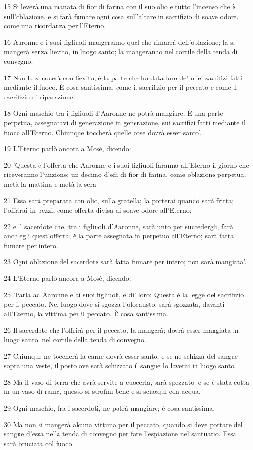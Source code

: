 \par 15 Si leverà una manata di fior di farina con il suo olio e tutto l'incenso che è sull'oblazione, e si farà fumare ogni cosa sull'altare in sacrifizio di soave odore, come una ricordanza per l'Eterno.
\par 16 Aaronne e i suoi figliuoli mangeranno quel che rimarrà dell'oblazione; la si mangerà senza lievito, in luogo santo; la mangeranno nel cortile della tenda di convegno.
\par 17 Non la si cocerà con lievito; è la parte che ho data loro de' miei sacrifizi fatti mediante il fuoco. È cosa santissima, come il sacrifizio per il peccato e come il sacrifizio di riparazione.
\par 18 Ogni maschio tra i figliuoli d'Aaronne ne potrà mangiare. È una parte perpetua, assegnatavi di generazione in generazione, sui sacrifizi fatti mediante il fuoco all'Eterno. Chiunque toccherà quelle cose dovrà esser santo'.
\par 19 L'Eterno parlò ancora a Mosè, dicendo:
\par 20 'Questa è l'offerta che Aaronne e i suoi figliuoli faranno all'Eterno il giorno che riceveranno l'unzione: un decimo d'efa di fior di farina, come oblazione perpetua, metà la mattina e metà la sera.
\par 21 Essa sarà preparata con olio, sulla gratella; la porterai quando sarà fritta; l'offrirai in pezzi, come offerta divisa di soave odore all'Eterno;
\par 22 e il sacerdote che, tra i figliuoli d'Aaronne, sarà unto per succedergli, farà anch'egli quest'offerta; è la parte assegnata in perpetuo all'Eterno; sarà fatta fumare per intero.
\par 23 Ogni oblazione del sacerdote sarà fatta fumare per intero; non sarà mangiata'.
\par 24 L'Eterno parlò ancora a Mosè, dicendo:
\par 25 'Parla ad Aaronne e ai suoi figliuoli, e di' loro: Questa è la legge del sacrifizio per il peccato. Nel luogo dove si sgozza l'olocausto, sarà sgozzata, davanti all'Eterno, la vittima per il peccato. È cosa santissima.
\par 26 Il sacerdote che l'offrirà per il peccato, la mangerà; dovrà esser mangiata in luogo santo, nel cortile della tenda di convegno.
\par 27 Chiunque ne toccherà la carne dovrà esser santo; e se ne schizza del sangue sopra una veste, il posto ove sarà schizzato il sangue lo laverai in luogo santo.
\par 28 Ma il vaso di terra che avrà servito a cuocerla, sarà spezzato; e se è stata cotta in un vaso di rame, questo si strofini bene e si sciacqui con acqua.
\par 29 Ogni maschio, fra i sacerdoti, ne potrà mangiare; è cosa santissima.
\par 30 Ma non si mangerà alcuna vittima per il peccato, quando si deve portare del sangue d'essa nella tenda di convegno per fare l'espiazione nel santuario. Essa sarà bruciata col fuoco.

